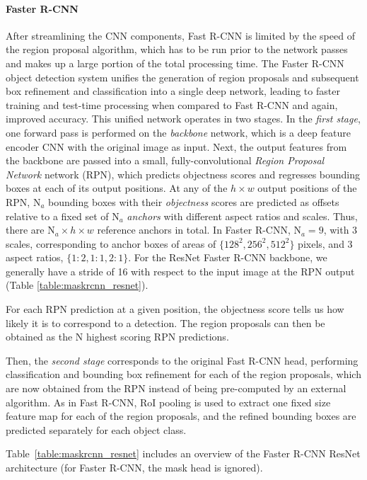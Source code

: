 \paragraph{Faster R-CNN}
After streamlining the CNN components, Fast R-CNN is limited by the speed of the region proposal
algorithm, which has to be run prior to the network passes and makes up a large portion of the total
processing time.
The Faster R-CNN object detection system \cite{FasterRCNN} unifies the generation of region proposals and subsequent box refinement and
classification into a single deep network, leading to faster training and test-time processing when compared to Fast R-CNN
and again, improved accuracy.
This unified network operates in two stages.
In the \emph{first stage}, one forward pass is performed on the \emph{backbone} network,
which is a deep feature encoder CNN with the original image as input.
Next, the output features from the backbone are passed into a small, fully-convolutional \emph{Region Proposal Network} network (RPN), which
predicts objectness scores and regresses bounding boxes at each of its output positions.
At any of the $h \times w$ output positions of the RPN,
$\text{N}_a$ bounding boxes with their \emph{objectness} scores are predicted as offsets relative to a fixed set of $\text{N}_a$ \emph{anchors} with different
aspect ratios and scales. Thus, there are $\text{N}_a \times h \times w$ reference anchors in total.
In Faster R-CNN, $\text{N}_a = 9$, with 3 scales, corresponding
to anchor boxes of areas of $\{128^2, 256^2, 512^2\}$ pixels, and 3 aspect ratios,
$\{1:2, 1:1, 2:1\}$. For the ResNet Faster R-CNN backbone, we generally have a stride of 16
with respect to the input image at the RPN output (Table \ref{table:maskrcnn_resnet}).

For each RPN prediction at a given position, the objectness score tells us how likely it is to correspond to a detection.
The region proposals can then be obtained as the N highest scoring RPN predictions.

Then, the \emph{second stage} corresponds to the original Fast R-CNN head, performing classification
and bounding box refinement for each of the region proposals, which are now obtained
from the RPN instead of being pre-computed by an external algorithm.
As in Fast R-CNN, RoI pooling is used to extract one fixed size feature map for each of the region proposals,
and the refined bounding boxes are predicted separately for each object class.

Table~\ref{table:maskrcnn_resnet} includes an overview of the Faster R-CNN ResNet architecture
(for Faster R-CNN, the mask head is ignored).


